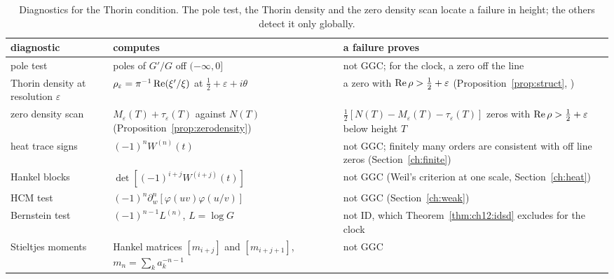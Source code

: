 \begin{table}[htbp]
\centering\small
\begin{tabular}{p{}p{}p{}}
\toprule
diagnostic & computes & a failure proves\\
\midrule
pole test & poles of $G'/G$ off $(-\infty,0]$ & \raggedright not GGC; for the clock, a zero off the line\tabularnewline
\raggedright Thorin density at resolution $\varepsilon$ & $\rho_\varepsilon=\pi^{-1}\operatorname{Re}(\xi'/\xi)$ at $\frac12+\varepsilon+i\theta$ & \raggedright a zero with $\operatorname{Re}\rho>\frac12+\varepsilon$ (Proposition~\ref{prop:struct}, \cite{Lagarias})\tabularnewline
zero density scan & \raggedright $M_\varepsilon(T)+\tau_\varepsilon(T)$ against $N(T)$ (Proposition~\ref{prop:zerodensity}) & \raggedright ${\frac12[N(T)-M_\varepsilon(T)-\tau_\varepsilon(T)]}$ zeros with $\operatorname{Re}\rho>\frac12+\varepsilon$ below height $T$\tabularnewline
heat trace signs & $(-1)^nW^{(n)}(t)$ & \raggedright not GGC; finitely many orders are consistent with off line zeros (Section~\ref{ch:finite})\tabularnewline
Hankel blocks & $\det[(-1)^{i+j}W^{(i+j)}(t)]$ & \raggedright not GGC (Weil's criterion at one scale, Section~\ref{ch:heat})\tabularnewline
HCM test & $(-1)^n\partial_w^n[\varphi(uv)\varphi(u/v)]$ & not GGC (Section~\ref{ch:weak})\\
Bernstein test & $(-1)^{n-1}L^{(n)}$, $L=\log G$ & \raggedright not ID, which Theorem~\ref{thm:ch12:idsd} excludes for the clock\tabularnewline
Stieltjes moments & \raggedright Hankel matrices $[m_{i+j}]$ and $[m_{i+j+1}]$, $m_n=\sum_ka_k^{-n-1}$ & not GGC\\
\bottomrule
\end{tabular}
\caption{Diagnostics for the Thorin condition. The pole test, the Thorin density and the zero density scan locate a failure in height; the others detect it only globally.}
\label{tab:ch3:diag}
\end{table}

